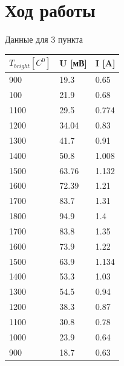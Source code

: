 \documentclass[a4paper,12pt]{article} %
\begin{document}
	\section{Ход работы}
	
	Данные для 3 пункта 
	\begin{table}[h]
		\centering
		\begin{tabular}{|l|l|l|}
		\hline
		$T_{bright} [C^{0}]$				  & U [мВ] & I [A]     \\ \hline
		900                                   & 19.3       & 0.65  \\ \hline
		100                                   & 21.9       & 0.68  \\ \hline
		1100                                  & 29.5       & 0.774 \\ \hline
		1200                                  & 34.04      & 0.83  \\ \hline
		1300                                  & 41.7       & 0.91  \\ \hline
		1400                                  & 50.8       & 1.008 \\ \hline
		1500                                  & 63.76      & 1.132 \\ \hline
		1600                                  & 72.39      & 1.21  \\ \hline
		1700                                  & 83.7       & 1.31  \\ \hline
		1800                                  & 94.9       & 1.4   \\ \hline
		1700                                  & 83.8       & 1.35  \\ \hline
		1600                                  & 73.9       & 1.22  \\ \hline
		1500                                  & 63.9       & 1.134 \\ \hline
		1400                                  & 53.3       & 1.03  \\ \hline
		1300                                  & 54.5       & 0.94  \\ \hline
		1200                                  & 38.3       & 0.87  \\ \hline
		1100                                  & 30.8       & 0.78  \\ \hline
		1000                                  & 23.9       & 0.64  \\ \hline
		900                                   & 18.7       & 0.63  \\ \hline
		\end{tabular}
		\end{table}
\end{document}
